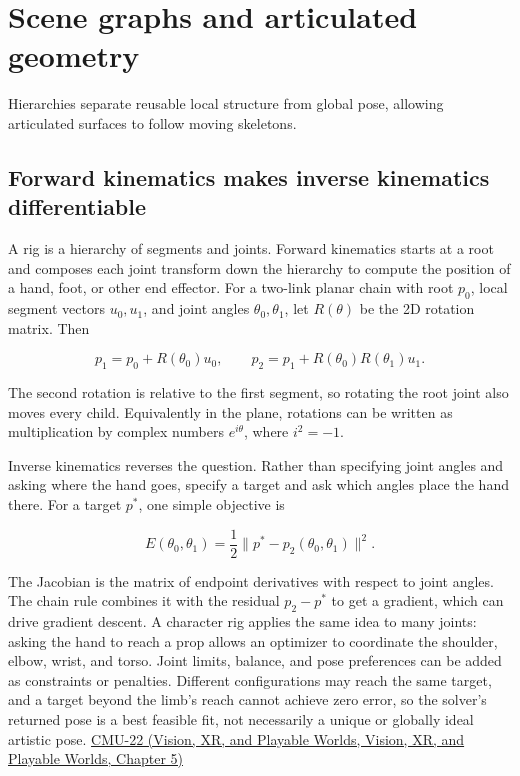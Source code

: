 \section{Scene graphs and articulated geometry}\label{04-visual-computing-ii-ch029-scene-graphs-and-articulated-geometry}

Hierarchies separate reusable local structure from global pose, allowing articulated surfaces to follow moving skeletons.

\subsection{Forward kinematics makes inverse kinematics differentiable}\label{04-visual-computing-ii-ch029-forward-kinematics-makes-inverse-kinematics-differentiable}

A rig is a hierarchy of segments and joints. Forward kinematics starts at a root and composes each joint transform down the hierarchy to compute the position of a hand, foot, or other end effector. For a two-link planar chain with root \(p_0\), local segment vectors \(u_0,u_1\), and joint angles \(\theta_0,\theta_1\), let \(R(\theta)\) be the 2D rotation matrix. Then

\[
p_1=p_0+R(\theta_0)u_0,\qquad
p_2=p_1+R(\theta_0)R(\theta_1)u_1.
\]

The second rotation is relative to the first segment, so rotating the root joint also moves every child. Equivalently in the plane, rotations can be written as multiplication by complex numbers \(e^{i\theta}\), where \(i^2=-1\).

Inverse kinematics reverses the question. Rather than specifying joint angles and asking where the hand goes, specify a target and ask which angles place the hand there. For a target \(p^*\), one simple objective is

\[
E(\theta_0,\theta_1)=\frac12\|p^*-p_2(\theta_0,\theta_1)\|^2.
\]

The Jacobian is the matrix of endpoint derivatives with respect to joint angles. The chain rule combines it with the residual \(p_2-p^*\) to get a gradient, which can drive gradient descent. A character rig applies the same idea to many joints: asking the hand to reach a prop allows an optimizer to coordinate the shoulder, elbow, wrist, and torso. Joint limits, balance, and pose preferences can be added as constraints or penalties. Different configurations may reach the same target, and a target beyond the limb's reach cannot achieve zero error, so the solver's returned pose is a best feasible fit, not necessarily a unique or globally ideal artistic pose. \href{../07-Vision-XR-and-Playable-Worlds/main.pdf\#nameddest=04-visual-computing-ii-ch036-cmu-22---optimization}{CMU-22 (Vision, XR, and Playable Worlds, Vision, XR, and Playable Worlds, Chapter 5)}

